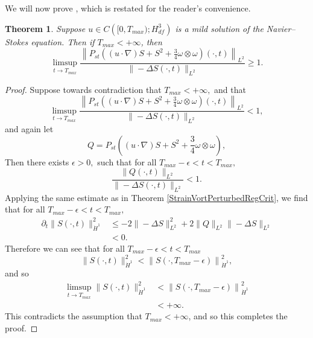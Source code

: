 \documentclass[11pt]{article}
\theoremstyle{plain}
\newtheorem{theorem}{Theorem}[section]
\theoremstyle{remark}
\numberwithin{equation}{section}
\begin{document}
We will now prove , which is restated for the reader's convenience.

\begin{theorem} \label{EndpointRegCrit}
Suppose $u\in C\left([0,T_{max});H^3_{df}\right)$ is a mild solution of the Navier--Stokes equation.
Then if $T_{max}<+\infty$, then
\begin{equation}
    \limsup_{t\to T_{max}}
    \frac{\left\|P_{st}\left((u\cdot\nabla)S
    +S^2+\frac{3}{4}\omega\otimes\omega\right)
    (\cdot,t)\right\|_{L^2}}
    {\|-\Delta S(\cdot,t)\|_{L^2}} \geq 1.
\end{equation}
\end{theorem}

\begin{proof}
Suppose towards contradiction that $T_{max}<+\infty,$ and that
\begin{equation}
    \limsup_{t\to T_{max}}
    \frac{\left\|P_{st}\left((u\cdot\nabla)S
    +S^2+\frac{3}{4}\omega\otimes\omega\right)
    (\cdot,t)\right\|_{L^2}}
    {\|-\Delta S(\cdot,t)\|_{L^2}} < 1,
\end{equation}
and again let
\begin{equation}
    Q=P_{st}\left((u\cdot\nabla)S
    +S^2+\frac{3}{4}\omega\otimes\omega\right),
\end{equation}
Then there exists $\epsilon>0,$ such that for all
$T_{max}-\epsilon<t<T_{max},$
\begin{equation}
    \frac{\|Q(\cdot,t)\|_{L^2}}
    {\|-\Delta S(\cdot,t)\|_{L^2}} < 1.
\end{equation}
Applying the same estimate as in Theorem \ref{StrainVortPerturbedRegCrit},
we find that for all $T_{max}-\epsilon<t<T_{max},$
\begin{align}
    \partial_t \|S(\cdot,t)\|_{\dot{H}^1}^2
    &\leq
    -2\|-\Delta S\|_{L^2}^2
    +2\|Q\|_{L^2}\|-\Delta S\|_{L^2} \\
    &< 0.
\end{align}
Therefore we can see that 
for all $T_{max}-\epsilon<t<T_{max}$
\begin{equation}
    \|S(\cdot,t)\|_{\dot{H}^1}^2 <
    \left\|S\left(\cdot,T_{max}-\epsilon\right)
    \right\|_{\dot{H}^1}^2,
\end{equation}
and so
\begin{align}
    \limsup_{t\to T_{max}}\|S(\cdot,t)\|_{\dot{H}^1}^2
    &<
    \left\|S\left(\cdot,T_{max}-\epsilon\right)
    \right\|_{\dot{H}^1}^2 \\
    &<
    +\infty.
\end{align}
This contradicts the assumption that $T_{max}<+\infty$, 
and so this completes the proof.
\end{proof}
\end{document}
